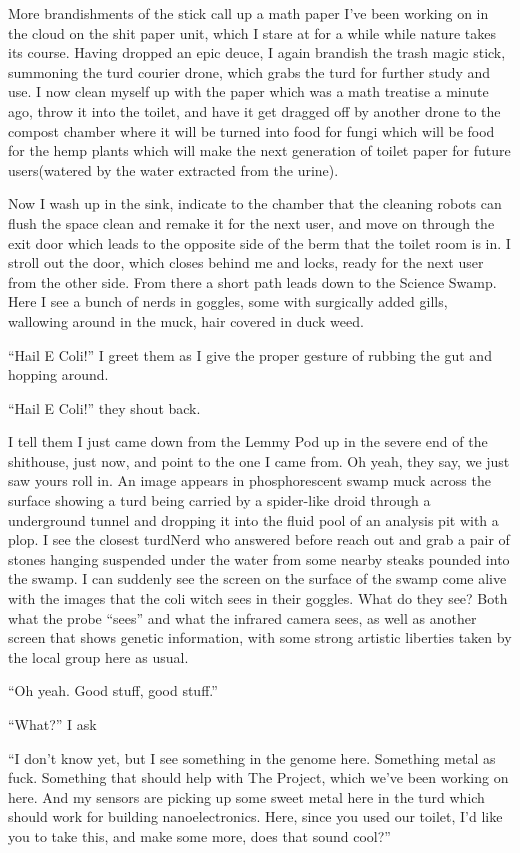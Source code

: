 More brandishments of the stick call up a math paper I've been working
on in the cloud on the shit paper unit, which I stare at for a while
while nature takes its course. Having dropped an epic deuce, I again
brandish the trash magic stick, summoning the turd courier drone, which
grabs the turd for further study and use. I now clean myself up with the
paper which was a math treatise a minute ago, throw it into the toilet,
and have it get dragged off by another drone to the compost chamber
where it will be turned into food for fungi which will be food for the
hemp plants which will make the next generation of toilet paper for
future users(watered by the water extracted from the urine).

Now I wash up in the sink, indicate to the chamber that the cleaning
robots can flush the space clean and remake it for the next user, and
move on through the exit door which leads to the opposite side of the
berm that the toilet room is in. I stroll out the door, which closes
behind me and locks, ready for the next user from the other side. From
there a short path leads down to the Science Swamp. Here I see a bunch
of nerds in goggles, some with surgically added gills, wallowing around
in the muck, hair covered in duck weed.

``Hail E Coli!'' I greet them as I give the proper gesture of rubbing
the gut and hopping around.

``Hail E Coli!'' they shout back.

I tell them I just came down from the Lemmy Pod up in the severe end of
the shithouse, just now, and point to the one I came from. Oh yeah, they
say, we just saw yours roll in. An image appears in phosphorescent swamp
muck across the surface showing a turd being carried by a spider-like
droid through a underground tunnel and dropping it into the fluid pool
of an analysis pit with a plop. I see the closest turdNerd who answered
before reach out and grab a pair of stones hanging suspended under the
water from some nearby steaks pounded into the swamp. I can suddenly see
the screen on the surface of the swamp come alive with the images that
the coli witch sees in their goggles. What do they see? Both what the
probe ``sees'' and what the infrared camera sees, as well as another
screen that shows genetic information, with some strong artistic
liberties taken by the local group here as usual.

``Oh yeah. Good stuff, good stuff.''

``What?'' I ask

``I don't know yet, but I see something in the genome here. Something
metal as fuck. Something that should help with The Project, which we've
been working on here. And my sensors are picking up some sweet metal
here in the turd which should work for building nanoelectronics. Here,
since you used our toilet, I'd like you to take this, and make some
more, does that sound cool?''

